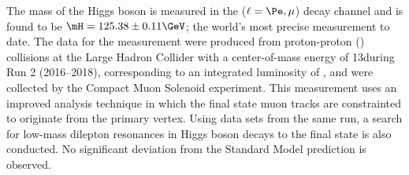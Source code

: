 % 
The mass of the Higgs boson is measured in the \hzzfourl
($\ell = \Pe, \mu$) %
decay channel and is found to be $\mH = 125.38 \pm 0.11\GeV$;
the world's most precise measurement to date. 
The data for the measurement were produced from proton-proton (\pp) collisions at the Large Hadron Collider with a center-of-mass energy of 13\TeV during Run 2 (2016--2018), corresponding to an integrated luminosity of \lumiruntwo, and were collected by the Compact Muon Solenoid experiment.
This measurement uses an improved analysis technique in which the final state muon tracks are constrainted to originate from the primary \pp vertex.
Using data sets from the same run, a search for low-mass dilepton resonances in Higgs boson decays to the \fourl final state is also conducted.
No significant deviation from the Standard Model prediction is observed.

